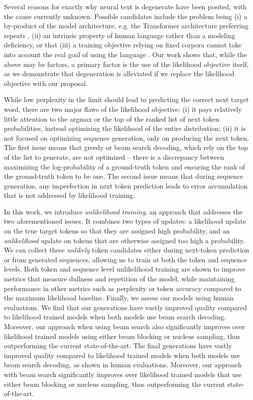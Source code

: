 Several reasons for exactly why neural text is degenerate have been posited, with the cause currently unknown. Possible candidates include the problem being (i) a by-product of the model architecture, e.g. the Transformer architecture preferring repeats \citep{holtzman2019curious,vig}, (ii) an intrinsic property of human language \citep{holtzman2019curious} rather than a modeling deficiency, or that (iii) a training objective relying on fixed corpora cannot take into account the real goal of using the language \citep{yejin_talk}. Our work shows that, while the above may be factors, a primary factor is the use of the likelihood objective itself, as we demonstrate that degeneration is alleviated if we replace the likelihood objective with our proposal.

While low perplexity in the limit should lead to predicting the correct next target word, there are two major flaws of the likelihood objective: (i)  it pays relatively little attention to the argmax or the top of the ranked list of next token probabilities, instead optimizing the likelihood of the entire distribution; (ii) it is not focused on optimizing sequence generation, only on producing the next token. The first issue means that greedy or beam search decoding, which rely on the top of the list to generate, are not optimized -- there is a discrepancy between maximizing the log-probability of a ground-truth token and ensuring the rank of the ground-truth token to be one. The second issue means that during sequence generation, any imperfection in next token prediction leads to error accumulation that is not addressed by likelihood training.

In this work, we introduce {\em unlikelihood training}, an approach that addresses the two aforementioned issues. It combines two types of updates: a likelihood update on the true target tokens so that they are assigned high probability, and an {\em unlikelihood} update on tokens that are otherwise assigned too high a probability. We can collect these {\em unlikely} token candidates either during next-token prediction or from generated sequences, allowing us to train at both the token and sequence levels. Both token and sequence level unlikelihood training are shown to improve metrics that measure dullness and repetition of the model, while maintaining performance in other metrics such as perplexity or token accuracy compared to the maximum likelihood baseline. Finally, we assess our models using human evaluations. We find that our generations have vastly improved quality compared to likelihood trained models when both models use beam search decoding. Moreover, our approach when using beam search also significantly improves over likelihood trained models using either beam blocking or nucleus sampling, thus outperforming the current state-of-the-art.
 The final generations have vastly improved quality compared to likelihood trained models when both models use beam search decoding, as shown in human evaluations. Moreover, our approach with beam search significantly improves over likelihood trained models that use either beam blocking or nucleus sampling, thus outperforming the current state-of-the-art.
\fi

